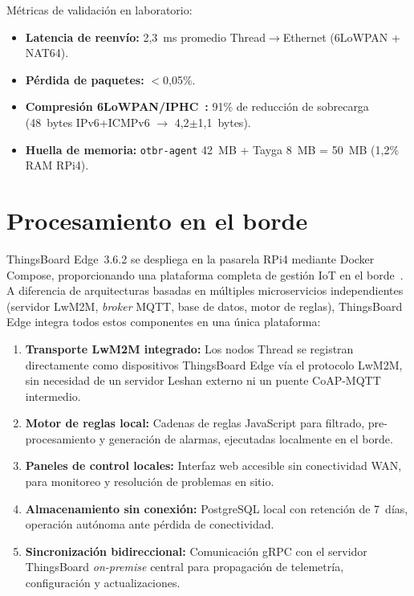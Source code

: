 Métricas de validación en laboratorio:

\begin{itemize}
    \item \textbf{Latencia de reenvío:} 2,3~ms promedio Thread$\rightarrow$Ethernet (6LoWPAN + NAT64).
    \item \textbf{Pérdida de paquetes:} $<$0,05\%.
    \item \textbf{Compresión 6LoWPAN/IPHC~\cite{RFC4944}:} 91\% de reducción de sobrecarga (48~bytes IPv6+ICMPv6 $\rightarrow$ 4,2$\pm$1,1~bytes).
    \item \textbf{Huella de memoria:} \texttt{otbr-agent} 42~MB + Tayga 8~MB = 50~MB (1,2\% RAM RPi4).
\end{itemize}


\section{Procesamiento en el borde}
\label{sec:gateway-borde}
\label{sec:gateway-tb-edge}

ThingsBoard Edge~3.6.2 se despliega en la pasarela RPi4 mediante Docker Compose, proporcionando una plataforma completa de gestión IoT en el borde~\cite{minhEdgeComputingIoTEnabled2022}.  A diferencia de arquitecturas basadas en múltiples microservicios independientes (servidor LwM2M, \emph{broker} MQTT, base de datos, motor de reglas), ThingsBoard Edge integra todos estos componentes en una única plataforma:

\begin{enumerate}
    \item \textbf{Transporte LwM2M integrado:} Los nodos Thread se registran directamente como dispositivos ThingsBoard Edge vía el protocolo LwM2M, sin necesidad de un servidor Leshan externo ni un puente CoAP-MQTT intermedio.
    \item \textbf{Motor de reglas local:} Cadenas de reglas JavaScript para filtrado, pre-procesamiento y generación de alarmas, ejecutadas localmente en el borde.
    \item \textbf{Paneles de control locales:} Interfaz web accesible sin conectividad WAN, para monitoreo y resolución de problemas en sitio.
    \item \textbf{Almacenamiento sin conexión:} PostgreSQL local con retención de 7~días, operación autónoma ante pérdida de conectividad.
    \item \textbf{Sincronización bidireccional:} Comunicación gRPC con el servidor ThingsBoard \emph{on-premise} central para propagación de telemetría, configuración y actualizaciones.
\end{enumerate}

